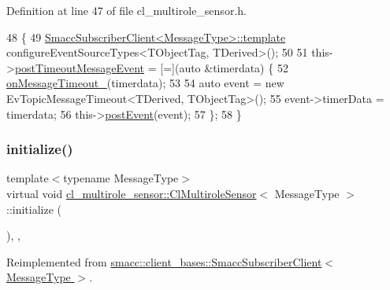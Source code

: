 Definition at line 47 of file cl\+\_\+multirole\+\_\+sensor.\+h.


\begin{DoxyCode}
48   \{
49     \hyperlink{classsmacc_1_1client__bases_1_1SmaccSubscriberClient}{SmaccSubscriberClient<MessageType>::template} 
      configureEventSourceTypes<TObjectTag, TDerived>();
50 
51     this->\hyperlink{classcl__multirole__sensor_1_1ClMultiroleSensor_a61a6e5dce7f1b34508701a8bc8f06ab9}{postTimeoutMessageEvent} = [=](\textcolor{keyword}{auto} &timerdata) \{
52       \hyperlink{classcl__multirole__sensor_1_1ClMultiroleSensor_afd37257b949c421d4f579b47352be95f}{onMessageTimeout\_}(timerdata);
53 
54       \textcolor{keyword}{auto} \textcolor{keyword}{event} = \textcolor{keyword}{new} EvTopicMessageTimeout<TDerived, TObjectTag>();
55       \textcolor{keyword}{event}->timerData = timerdata;
56       this->\hyperlink{classsmacc_1_1ISmaccClient_a21a79203cb44fc717d4d977c190327c6}{postEvent}(event);
57     \};
58   \}
\end{DoxyCode}
\mbox{\label{classcl__multirole__sensor_1_1ClMultiroleSensor_a3847e19f925f65dd034964eb2d0b3594}} 
\subsubsection{\texorpdfstring{initialize()}{initialize()}}
{\footnotesize\ttfamily template$<$typename Message\+Type$>$ \\
virtual void \hyperlink{classcl__multirole__sensor_1_1ClMultiroleSensor}{cl\+\_\+multirole\+\_\+sensor\+::\+Cl\+Multirole\+Sensor}$<$ Message\+Type $>$\+::initialize (\begin{DoxyParamCaption}{ }\end{DoxyParamCaption})\hspace{0.3cm}{\ttfamily [inline]}, {\ttfamily [override]}, {\ttfamily [virtual]}}



Reimplemented from \hyperlink{classsmacc_1_1client__bases_1_1SmaccSubscriberClient_af188f0f5e89de26a07e1f964cdd23a70}{smacc\+::client\+\_\+bases\+::\+Smacc\+Subscriber\+Client$<$ Message\+Type $>$}.



